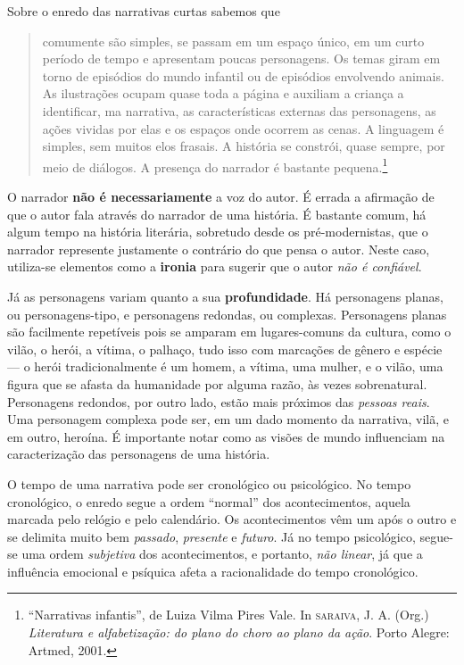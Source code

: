\documentclass[11pt]{extarticle}
\begin{document}
Sobre o enredo das narrativas curtas sabemos que

\begin{quote}
comumente são simples, se passam em um espaço único, em um curto período de tempo e apresentam poucas personagens. Os temas giram em torno de episódios do mundo infantil ou de episódios envolvendo animais. As ilustrações ocupam quase toda a página e auxiliam 
a criança a identificar, ma narrativa, as características externas das personagens, as ações vividas por elas e os espaços onde ocorrem as cenas. A linguagem é simples, sem muitos elos frasais. A história se constrói, quase sempre, por meio de diálogos. A presença do narrador é bastante pequena.\footnote{“Narrativas infantis”, de Luiza Vilma Pires Vale. In \textsc{saraiva}, J. A. (Org.) \textit{Literatura e alfabetização: do plano do choro ao plano da ação}. Porto Alegre: Artmed, 2001.}  
\end{quote}

O narrador \textbf{não é necessariamente} a voz do autor. É errada a afirmação de que o autor fala através do narrador de uma história. É bastante comum, há algum tempo na história literária, sobretudo desde os pré-modernistas, que o narrador represente justamente o contrário do que pensa o autor. Neste caso, utiliza-se elementos como a \textbf{ironia} para sugerir que o autor \textit{não é confiável}.

Já as personagens variam quanto a sua \textbf{profundidade}. Há personagens planas, ou personagens-tipo, e personagens redondas, ou complexas. Personagens planas são facilmente repetíveis pois se amparam em lugares-comuns da cultura, como o vilão, o herói, a vítima, o palhaço, tudo isso com marcações de gênero e espécie --- o herói tradicionalmente é um homem, a vítima, uma mulher, e o vilão, uma figura que se afasta da humanidade por alguma razão, às vezes sobrenatural. Personagens redondos, por outro lado, estão mais próximos das \textit{pessoas reais}. Uma personagem complexa pode ser, em um dado momento da narrativa, vilã, e em outro, heroína. É importante notar como as visões de mundo influenciam na caracterização das personagens de uma história.

O tempo de uma narrativa pode ser cronológico ou psicológico. No tempo cronológico, o enredo segue a ordem ``normal'' dos acontecimentos, aquela marcada pelo relógio e pelo calendário. Os acontecimentos vêm um após o outro e se delimita muito bem \textit{passado}, \textit{presente} e \textit{futuro}. Já no tempo psicológico, segue-se uma ordem \textit{subjetiva} dos acontecimentos, e portanto, \textit{não linear}, já que a influência emocional e psíquica afeta a racionalidade do tempo cronológico. 
\end{document}
